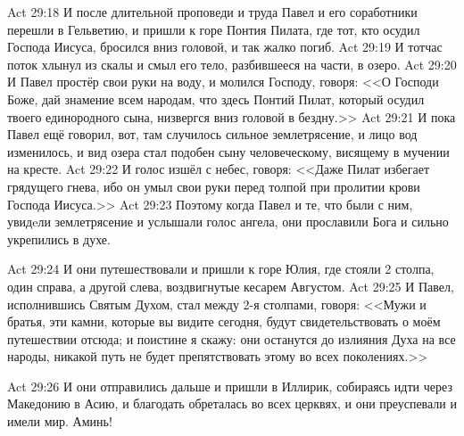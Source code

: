 \vs Act 29:18
И после длительной проповеди и труда Павел
и его соработники перешли в Гельветию,
и пришли к горе Понтия Пилата, где тот,
кто осудил Господа Иисуса,
бросился вниз головой, и так жалко погиб.
\vs Act 29:19
И тотчас поток хлынул из скалы и смыл его тело,
разбившееся на части, в озеро.
\vs Act 29:20
И Павел простёр свои руки на воду, 
и молился Господу, говоря:
<<О Господи Боже, дай знамение всем народам,
что здесь Понтий Пилат, который осудил твоего единородного сына,
низвергся вниз головой в бездну.>>
\vs Act 29:21
И пока Павел ещё говорил, вот,
там случилось сильное землетрясение,
и лицо вод изменилось, и вид озера стал подобен
сыну человеческому, висящему в мучении на кресте.
\vs Act 29:22
И голос изшёл с небес, говоря:
<<Даже Пилат избегает грядущего гнева,
ибо он умыл свои руки перед толпой
при пролитии крови Господа Иисуса.>>
\vs Act 29:23
Поэтому когда Павел и те, что были с ним,
увидeли землетрясение и услышали голос ангела,
они прославили Бога и сильно укрепились в духе.

\vs Act 29:24
И они путешествовали и пришли к горе Юлия,
где стояли 2 столпа, один справа, а другой слева,
воздвигнутые кесарем Августом.
\vs Act 29:25
И Павел, исполнившись Святым Духом,
стал между 2-я столпами, говоря:
<<Мужи и братья, эти камни, которые вы видите сегодня,
будут свидетельствовать о моём путешествии отсюда;
и поистине я скажу: они останутся до излияния Духа на все народы,
никакой путь не будет препятствовать этому во всех поколениях.>>

\vs Act 29:26
И они отправились дальше и пришли в Иллирик,
собираясь идти через Македонию в Асию,
и благодать обреталась во всех церквях,
и они преуспевали и имели мир. Аминь!
